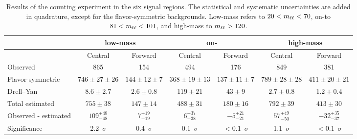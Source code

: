 
\begin{table}[hbtp]
 \renewcommand{\arraystretch}{1.3}
 \setlength{\belowcaptionskip}{6pt}
 \scriptsize
 \centering
 \caption{Results of the counting experiment in the six signal regions.
     The statistical and systematic uncertainties are added in quadrature, except for the flavor-symmetric backgrounds.
     Low-mass refers to $20 < m_{\ell\ell} < 70$\GeV, on-\Z to  $81 < m_{\ell\ell} < 101$\GeV, and high-mass to $m_{\ell\ell} > 120$\GeV.
     }
  \label{tab:METresults2012}
  \begin{tabular}{l| cc | cc | cc}

    							& \multicolumn{2}{c}{low-mass} & \multicolumn{2}{c}{on-\Z} & \multicolumn{2}{c}{high-mass} \\ 

    \hline
                                &  Central        & Forward  &  Central  & Forward   &  Central        & Forward \\ 

    \hline
        Observed       &  865                   & 154              &  494            &  176       &   849           &   381    \\

    \hline
        Flavor-symmetric    & $746\pm27\pm26$        & $144\pm12\pm7$  &  $368\pm19\pm13$ & $137\pm11\pm7$ & $789\pm28\pm28$ & $411\pm20\pm21$ \\

            Drell--Yan          & $8.6\pm2.7$            & $2.6\pm0.8$      & $119\pm21$ & $43\pm9$ & $2.7\pm0.8$ & $1.2\pm0.4$ \\

    \hline
            Total estimated          & $755\pm38$            & $147\pm14$      & $488\pm31$ & $180\pm16$ & $792\pm39$ & $413\pm30$ \\

    \hline
         Observed - estimated  & $109^{+48}_{-48}$      & $7^{+19}_{-19}$ & $6^{+37}_{-38} $ & $-5^{+21}_{-21}$ & $57^{+49}_{-50}$ & $-32^{+35}_{-37} $ \\ 

    \hline
   Significance      & 2.2~$\sigma$    &  0.4~$\sigma$  & 0.1~$\sigma$ & $<$0.1~$\sigma$ & 1.1~$\sigma$ & $<$0.1~$\sigma$ \\ 


  \end{tabular}
\end{table}


